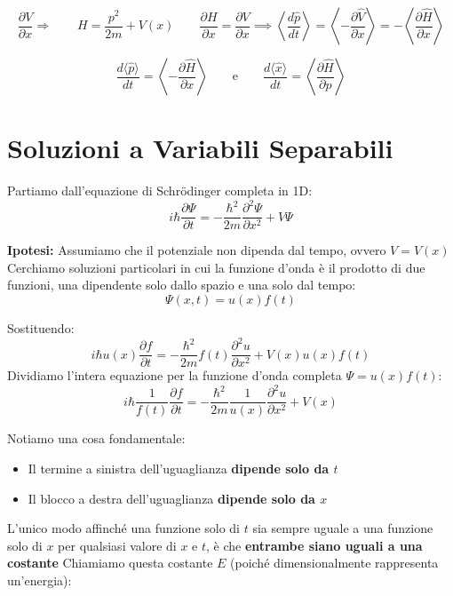 \documentclass[11pt, a4paper]{article}
\begin{document}
\begin{equation*}
\frac{\partial V}{\partial x} \Rightarrow \qquad H = \frac{p^2}{2m} + V(x) \qquad \frac{\partial H}{\partial x} = \frac{\partial V}{\partial x} \implies \left\langle \frac{d\hat{p}}{dt} \right\rangle = \left\langle -\frac{\partial \hat{V}}{\partial x} \right\rangle = -\left\langle \frac{\partial \hat{H}}{\partial x} \right\rangle
\end{equation*}

\begin{equation}
    \boxed{ \frac{d\langle \hat{p} \rangle}{dt} = \left\langle -\frac{\partial \hat{H}}{\partial x} \right\rangle } \qquad \text{e} \qquad \boxed{ \frac{d\langle \hat{x} \rangle}{dt} = \left\langle \frac{\partial \hat{H}}{\partial p} \right\rangle } %
\end{equation}

\section{Soluzioni a Variabili Separabili} %

Partiamo dall'equazione di Schrödinger completa in 1D: %
\begin{equation*}
    i\hbar \frac{\partial \Psi}{\partial t} = -\frac{\hbar^2}{2m} \frac{\partial^2 \Psi}{\partial x^2} + V\Psi %
\end{equation*}

\noindent
\textbf{Ipotesi:} Assumiamo che il potenziale non dipenda dal tempo, ovvero $V = V(x)$ %
Cerchiamo soluzioni particolari in cui la funzione d'onda è il prodotto di due funzioni, una dipendente solo dallo spazio e una solo dal tempo: %
\begin{equation*}
    \Psi(x,t) = u(x) f(t) %
\end{equation*}

Sostituendo: %
\begin{equation*}
    i\hbar u(x) \frac{\partial f}{\partial t} = -\frac{\hbar^2}{2m} f(t) \frac{\partial^2 u}{\partial x^2} + V(x) u(x) f(t) %
\end{equation*}
Dividiamo l'intera equazione per la funzione d'onda completa $\Psi = u(x)f(t)$: %
\begin{equation*}
    i\hbar \frac{1}{f(t)} \frac{\partial f}{\partial t} = -\frac{\hbar^2}{2m} \frac{1}{u(x)} \frac{\partial^2 u}{\partial x^2} + V(x) %
\end{equation*}

Notiamo una cosa fondamentale: %
\begin{itemize}
    \item Il termine a sinistra dell'uguaglianza \textbf{dipende solo da $t$} %
    \item Il blocco a destra dell'uguaglianza \textbf{dipende solo da $x$} %
\end{itemize}
L'unico modo affinché una funzione solo di $t$ sia sempre uguale a una funzione solo di $x$ per qualsiasi valore di $x$ e $t$, è che \textbf{entrambe siano uguali a una costante} %
Chiamiamo questa costante $E$ (poiché dimensionalmente rappresenta un'energia): %
\end{document}
